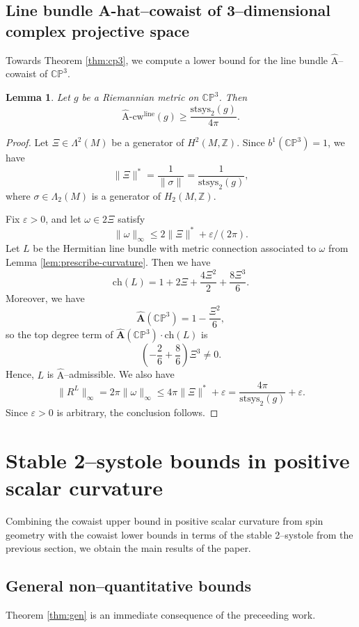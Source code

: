 \documentclass[12pt]{amsart}
\newtheorem{lemma}[theorem]{Lemma}
\theoremstyle{definition}
\numberwithin{equation}{section}
\newcommand{\Z}{\mathbb{Z}}
\newcommand{\eps}{\varepsilon}
\newcommand{\CP}{\mathbb{C}\mathbb{P}}
\newcommand{\acw}{\hat{\mathrm{A}}\text{-}\mathrm{cw}}
\newcommand{\ahat}{\hat{\mathrm{A}}}
\begin{document}
\subsection{Line bundle A-hat--cowaist of 3--dimensional complex projective space}
Towards Theorem \ref{thm:cp3}, we compute a lower bound for the line bundle $\ahat$--cowaist of $\CP^3$.

\begin{lemma}\label{lem:cw-cp3}
Let $g$ be a Riemannian metric on $\CP^3$. Then
\[ \acw^{\mathrm{line}}(g) \geq \frac{\mathrm{stsys}_2(g)}{4\pi}. \]
\end{lemma}
\begin{proof}
Let $\Xi \in \Lambda^2(M)$ be a generator of $H^2(M, \Z)$. Since $b^1(\CP^3) = 1$, we have
\[ \|\Xi\|^* = \frac{1}{\|\sigma\|} = \frac{1}{\mathrm{stsys}_2(g)}, \]
where $\sigma \in \Lambda_2(M)$ is a generator of $H_2(M, \Z)$.

Fix  $\eps > 0$, and let $\omega \in 2\Xi$ satisfy
\[ \|\omega\|_{\infty} \leq 2\|\Xi\|^* + \eps/(2\pi). \]
Let $L$ be the Hermitian line bundle with metric connection associated to $\omega$ from Lemma \ref{lem:prescribe-curvature}. Then we have
\[ \mathrm{ch}(L) = 1 + 2\Xi + \frac{4\Xi^2}{2} + \frac{8\Xi^3}{6}. \]
Moreover, we have
\[ \hat{\mathbf{A}}(\CP^3) = 1 - \frac{\Xi^2}{6}, \]
so the top degree term of $\hat{\mathbf{A}}(\CP^3) \cdot \mathrm{ch}(L)$ is
\[ \left(-\frac{2}{6} + \frac{8}{6}\right)\Xi^3 \neq 0. \]
Hence, $L$ is $\ahat$--admissible. We also have
\[ \|R^L\|_{\infty} = 2\pi \|\omega\|_{\infty} \leq 4\pi\|\Xi\|^* + \eps = \frac{4\pi}{\mathrm{stsys}_2(g)} + \eps. \]
Since $\eps > 0$ is arbitrary, the conclusion follows.
\end{proof}




\section{Stable 2--systole bounds in positive scalar curvature}\label{sec:main}

Combining the cowaist upper bound in positive scalar curvature from spin geometry with the cowaist lower bounds in terms of the stable 2--systole from the previous section, we obtain the main results of the paper.

\subsection{General non--quantitative bounds}
Theorem \ref{thm:gen} is an immediate consequence of the preceeding work.
\end{document}
